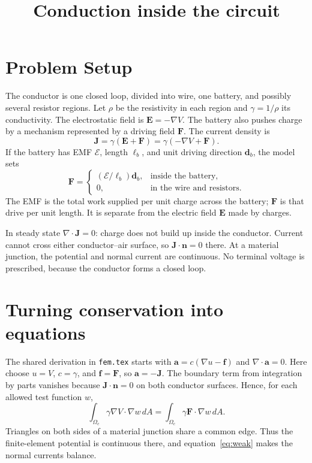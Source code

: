 \documentclass[11pt]{article}
\title{Conduction inside the circuit}
\author{}
\date{}
\begin{document}
\maketitle

\section{Problem Setup}
The conductor is one closed loop, divided into wire, one battery, and
possibly several resistor regions. Let $\rho$ be the resistivity in each
region and $\gamma=1/\rho$ its conductivity. The electrostatic field is
$\bm E=-\nabla V$. The battery also pushes charge by a mechanism represented
by a driving field $\bm F$. The current density is
\begin{equation}
 \bm J=\gamma(\bm E+\bm F)
       =\gamma(-\nabla V+\bm F).
 \label{eq:current}
\end{equation}
If the battery has EMF $\mathcal E$, length $\ell_b$, and unit driving
direction $\bm d_b$, the model sets
\begin{equation}
 \bm F=\begin{cases}
       (\mathcal E/\ell_b)\bm d_b,&\text{inside the battery},\\
       0,&\text{in the wire and resistors}.
       \end{cases}
\end{equation}
The EMF is the total work supplied per unit charge across the battery;
$\bm F$ is that drive per unit length. It is separate from the electric
field $\bm E$ made by charges.

In steady state $\nabla\cdot\bm J=0$: charge does not build up inside
the conductor. Current cannot cross either conductor--air surface, so
$\bm J\cdot\bm n=0$ there. At a material junction, the potential and
normal current are continuous. No terminal voltage is prescribed,
because the conductor forms a closed loop.

\section{Turning conservation into equations}
The shared derivation in \texttt{fem.tex} starts with
$\bm a=c(\nabla u-\bm f)$ and $\nabla\cdot\bm a=0$. Here choose
$u=V$, $c=\gamma$, and $\bm f=\bm F$, so $\bm a=-\bm J$.
The boundary term from integration by parts vanishes because
$\bm J\cdot\bm n=0$ on both conductor surfaces. Hence, for each
allowed test function $w$,
\begin{equation}
 \int_{\Omega_c}\gamma\nabla V\cdot\nabla w\,dA
 =\int_{\Omega_c}\gamma\bm F\cdot\nabla w\,dA.
 \label{eq:weak}
\end{equation}
Triangles on both sides of a material junction share a common edge.
Thus the finite-element potential is continuous there, and
equation~\eqref{eq:weak} makes the normal currents balance.
\end{document}
